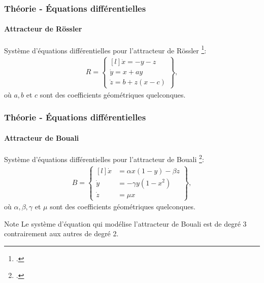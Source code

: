 \begin{frame}
    \frametitle{Théorie - Équations différentielles}
    \framesubtitle{Attracteur de Rössler}
    Système d'équations différentielles pour l'attracteur de Rössler \footcite{rossler}:
    \begin{align}
            R =
            \begin{Bmatrix*}[l]
                \Dot{x} = -y - z \\
                \Dot{y} = x + ay \\
                \Dot{z} = b + z(x - c)
            \end{Bmatrix*},
    \end{align}
    où $a, b$ et $c$ sont des coefficients géométriques quelconques.
\end{frame}

\begin{frame}
    \frametitle{Théorie - Équations différentielles}
    \framesubtitle{Attracteur de Bouali}
    Système d'équations différentielles pour l'attracteur de Bouali \footcite{bouali}:
    \begin{align}
            B =
            \begin{Bmatrix*}[l]
                \Dot{x} &= \alpha x(1 - y) - \beta z \\
                \Dot{y} &= -\gamma y(1 - x^2) \\
                \Dot{z} &= \mu x
            \end{Bmatrix*},
    \end{align}
    où $\alpha, \beta, \gamma$ et $\mu$ sont des coefficients géométriques quelconques. \vspace{0.5cm}
    \begin{noteblock}{Note}
        Le système d'équation qui modélise l'attracteur de Bouali est de degré 3 contrairement aux autres de degré 2.
    \end{noteblock}
\end{frame}

\begin{frame}
    \begin{center}
    \vspace{0.5cm}
    \end{center}
\end{frame}

